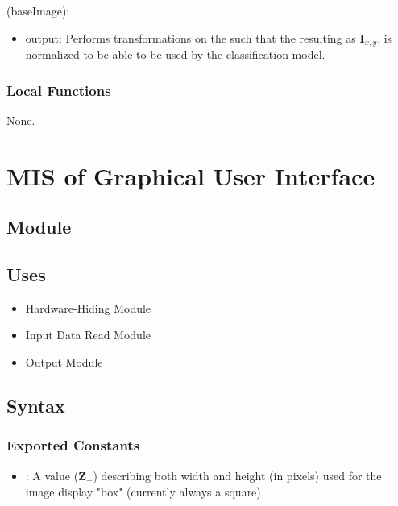 \documentclass[12pt, titlepage]{article}
\begin{document}
\noindent {}(baseImage):
\begin{itemize} 
\item output: Performs transformations on the  such that the resulting  
as $\mathbf{I}_{x,y}$, is normalized to be able to be used by the classification model.
\end{itemize}

\subsubsection{Local Functions}

None.

\section{MIS of Graphical User Interface} \label{ModuleGUI} 

\subsection{Module}

 

\subsection{Uses}

\begin{itemize}
  \item Hardware-Hiding Module 
  \item Input Data Read Module 
  \item Output Module  
\end{itemize}

\subsection{Syntax}

\subsubsection{Exported Constants}

\begin{itemize}
  \item {}: A value ($\mathbf{Z}_{+}$) describing both width and height (in pixels) used for the image
  display "box" (currently always a square)
\end{itemize}
\end{document}
